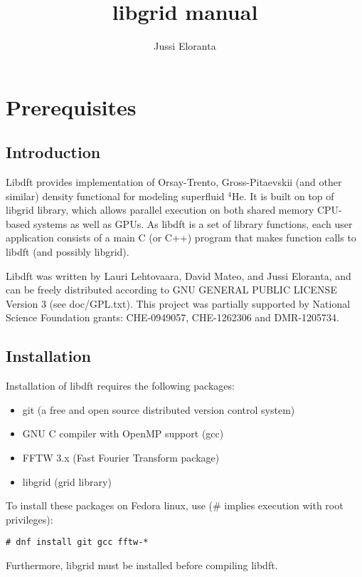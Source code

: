 \documentclass[12pt,letterpaper]{report}
\author{Jussi Eloranta}
\title{libgrid manual}
\begin{document}
\maketitle

\chapter{Prerequisites}

\section{Introduction}

Libdft provides implementation of Orsay-Trento, Gross-Pitaevskii (and other 
similar) density functional for modeling superfluid $^4$He. It is built on top 
of libgrid library, which allows parallel execution on both shared memory 
CPU-based systems as well as GPUs. As libdft is a set of library functions,
each user application consists of a main C (or C++) program that makes
function calls to libdft (and possibly libgrid).

Libdft was written by Lauri Lehtovaara, David Mateo, and Jussi Eloranta, and 
can be freely distributed according to GNU GENERAL PUBLIC LICENSE Version 3 
(see doc/GPL.txt). This project was partially supported by National Science 
Foundation grants: CHE-0949057, CHE-1262306 and DMR-1205734.

\section{Installation}

Installation of libdft requires the following packages:
\begin{itemize}
\item git (a free and open source distributed version control system)
\item GNU C compiler with OpenMP support (gcc)
\item FFTW 3.x (Fast Fourier Transform package)
\item libgrid (grid library)
\end{itemize}
To install these packages on Fedora linux, use (\# implies execution with root privileges): 
\begin{verbatim}
# dnf install git gcc fftw-*
\end{verbatim}
Furthermore, libgrid must be installed before compiling libdft.
\end{document}

